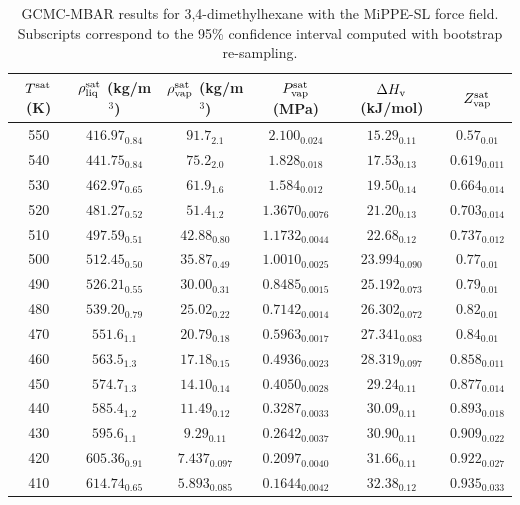 \documentclass[journal=jctc,manuscript=article]{achemso}
\begin{document}
\begin{table}[htb!]
	\caption{GCMC-MBAR results for 3,4-dimethylhexane with the MiPPE-SL force field. Subscripts correspond to the 95\% confidence interval computed with bootstrap re-sampling.}
	\begin{center}
		\begin{tabular}{|c|c|c|c|c|c|}
			\hline
			$T^{\rm sat}$ (K) & $\rho_{\rm liq}^{\rm sat}$ (kg/m$^3$) & $\rho_{\rm vap}^{\rm sat}$ (kg/m$^3$) & $P_{\rm vap}^{\rm sat}$ (MPa) & $\Delta H_{\rm v}$ (kJ/mol) & $Z_{\rm vap}^{\rm sat}$ \\ \hline
			550 & $416.97_{0.84}$ & $91.7_{2.1}$ & $2.100_{0.024}$ & $15.29_{0.11}$ & $0.57_{0.01}$ \\
			540 & $441.75_{0.84}$ & $75.2_{2.0}$ & $1.828_{0.018}$ & $17.53_{0.13}$ & $0.619_{0.011}$ \\
			530 & $462.97_{0.65}$ & $61.9_{1.6}$ & $1.584_{0.012}$ & $19.50_{0.14}$ & $0.664_{0.014}$ \\
			520 & $481.27_{0.52}$ & $51.4_{1.2}$ & $1.3670_{0.0076}$ & $21.20_{0.13}$ & $0.703_{0.014}$ \\
			510 & $497.59_{0.51}$ & $42.88_{0.80}$ & $1.1732_{0.0044}$ & $22.68_{0.12}$ & $0.737_{0.012}$ \\
			500 & $512.45_{0.50}$ & $35.87_{0.49}$ & $1.0010_{0.0025}$ & $23.994_{0.090}$ & $0.77_{0.01}$ \\
			490 & $526.21_{0.55}$ & $30.00_{0.31}$ & $0.8485_{0.0015}$ & $25.192_{0.073}$ & $0.79_{0.01}$ \\
			480 & $539.20_{0.79}$ & $25.02_{0.22}$ & $0.7142_{0.0014}$ & $26.302_{0.072}$ & $0.82_{0.01}$ \\
			470 & $551.6_{1.1}$ & $20.79_{0.18}$ & $0.5963_{0.0017}$ & $27.341_{0.083}$ & $0.84_{0.01}$ \\
			460 & $563.5_{1.3}$ & $17.18_{0.15}$ & $0.4936_{0.0023}$ & $28.319_{0.097}$ & $0.858_{0.011}$ \\
			450 & $574.7_{1.3}$ & $14.10_{0.14}$ & $0.4050_{0.0028}$ & $29.24_{0.11}$ & $0.877_{0.014}$ \\
			440 & $585.4_{1.2}$ & $11.49_{0.12}$ & $0.3287_{0.0033}$ & $30.09_{0.11}$ & $0.893_{0.018}$ \\
			430 & $595.6_{1.1}$ & $9.29_{0.11}$ & $0.2642_{0.0037}$ & $30.90_{0.11}$ & $0.909_{0.022}$ \\
			420 & $605.36_{0.91}$ & $7.437_{0.097}$ & $0.2097_{0.0040}$ & $31.66_{0.11}$ & $0.922_{0.027}$ \\
			410 & $614.74_{0.65}$ & $5.893_{0.085}$ & $0.1644_{0.0042}$ & $32.38_{0.12}$ & $0.935_{0.033}$ \\

\end{tabular}
\end{center}
\end{table}
\end{document}
